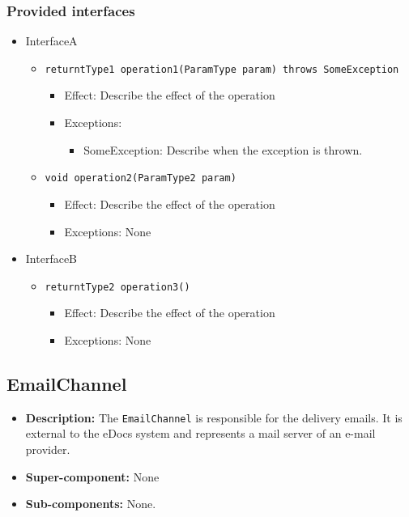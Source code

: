 \documentclass[a4paper,10pt]{article}
\begin{document}
\subsubsection*{Provided interfaces}
\begin{itemize}
    \item InterfaceA
    \begin{itemize}
        \item \texttt{returntType1 operation1(ParamType param) throws SomeException}
        \begin{itemize}
            \item Effect: Describe the effect of the operation
            \item Exceptions:
            \begin{itemize}
                \item SomeException: Describe when the exception is thrown.
            \end{itemize}
		\end{itemize}
        \item \texttt{void operation2(ParamType2 param)}
        \begin{itemize}
            \item Effect: Describe the effect of the operation
            \item Exceptions: None
        \end{itemize}
    \end{itemize}

    \item InterfaceB
    \begin{itemize}
        \item \texttt{returntType2 operation3()}
        \begin{itemize}
            \item Effect: Describe the effect of the operation
            \item Exceptions: None
        \end{itemize}
    \end{itemize}
\end{itemize}

\subsection{EmailChannel}
\begin{itemize}
    \item \textbf{Description:} The \texttt{EmailChannel} is responsible for the delivery emails.
It is external to the eDocs system and represents a mail server of an e-mail provider.
    \item \textbf{Super-component:} None
    \item \textbf{Sub-components:} None.
\end{itemize}
\end{document}
